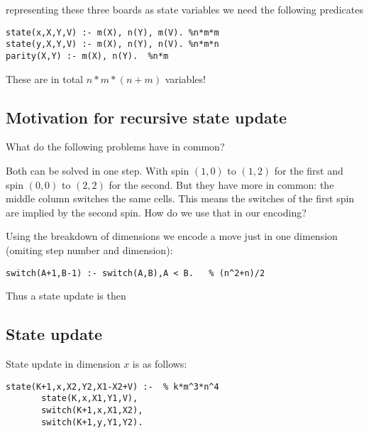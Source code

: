 \documentclass[]{llncs}
\newcommand{\spintable}[9]{ 
\node [matrix,ampersand replacement=\&,nodes={minimum size=4mm}]
{
    \node {#1}; \& \node{#2}; \& \node {#3}; \\ 
    \node {#4}; \& \node{#5}; \& \node {#6}; \\ 
    \node {#7}; \& \node{#8}; \& \node {#9}; \\ 
}; 
}
\begin{document}
representing these three boards as state variables we need the following predicates

\begin{verbatim} 
state(x,X,Y,V) :- m(X), n(Y), m(V). %n*m*m 
state(y,X,Y,V) :- m(X), n(Y), n(V). %n*m*n 
parity(X,Y) :- m(X), n(Y).  %n*m 
\end{verbatim}

These are in total $n*m*(n+m)$ variables!

\subsection{Motivation for recursive state update}

What do the following problems have in common? 


Both can be solved in one step. With spin $(1,0)$ to $(1,2)$ for the first and spin
$(0,0)$ to $(2,2)$ for the second.  But they have more in common: the middle column
switches the same cells. This means the switches of the first spin are implied by the
second spin. How do we use that in our encoding?

Using the breakdown of dimensions we encode a move just in one dimension (omiting
step number and dimension):

\begin{verbatim} 
switch(A+1,B-1) :- switch(A,B),A < B.   % (n^2+n)/2 
\end{verbatim}

Thus a state update is then 


\subsection{State update} State update in dimension $x$ is as follows:

\begin{verbatim} 
state(K+1,x,X2,Y2,X1-X2+V) :-  % k*m^3*n^4 
       state(K,x,X1,Y1,V),
       switch(K+1,x,X1,X2), 
       switch(K+1,y,Y1,Y2).  
\end{verbatim}
\end{document}
